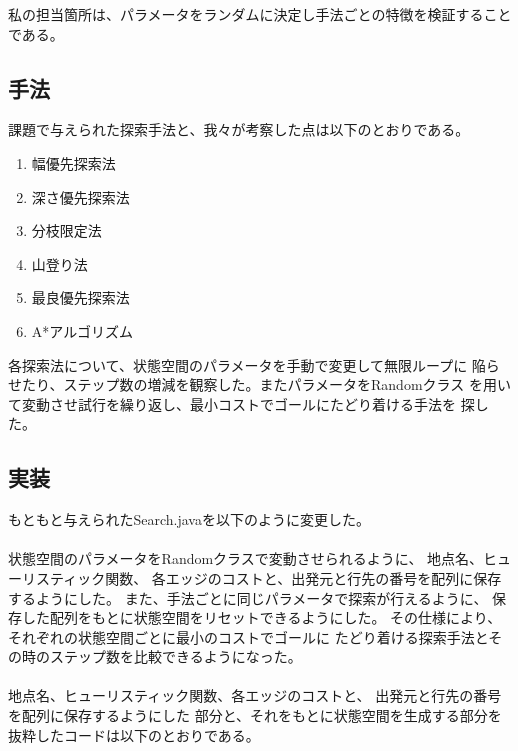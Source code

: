 \documentclass{jarticle}
\begin{document}
私の担当箇所は、パラメータをランダムに決定し手法ごとの特徴を検証することである。
\subsection{手法}
課題で与えられた探索手法と、我々が考察した点は以下のとおりである。

\begin{enumerate}
\item 幅優先探索法
\item 深さ優先探索法
\item 分枝限定法
\item 山登り法
\item 最良優先探索法
\item A*アルゴリズム
\end{enumerate}

各探索法について、状態空間のパラメータを手動で変更して無限ループに
陥らせたり、ステップ数の増減を観察した。またパラメータをRandomクラス
を用いて変動させ試行を繰り返し、最小コストでゴールにたどり着ける手法を
探した。
\subsection{実装}

もともと与えられたSearch.javaを以下のように変更した。

\paragraph{}
状態空間のパラメータをRandomクラスで変動させられるように、
地点名、ヒューリスティック関数、
各エッジのコストと、出発元と行先の番号を配列に保存するようにした。
また、手法ごとに同じパラメータで探索が行えるように、
保存した配列をもとに状態空間をリセットできるようにした。
その仕様により、それぞれの状態空間ごとに最小のコストでゴールに
たどり着ける探索手法とその時のステップ数を比較できるようになった。\\

\paragraph{}
地点名、ヒューリスティック関数、各エッジのコストと、
出発元と行先の番号を配列に保存するようにした
部分と、それをもとに状態空間を生成する部分を
抜粋したコードは以下のとおりである。
\end{document}
